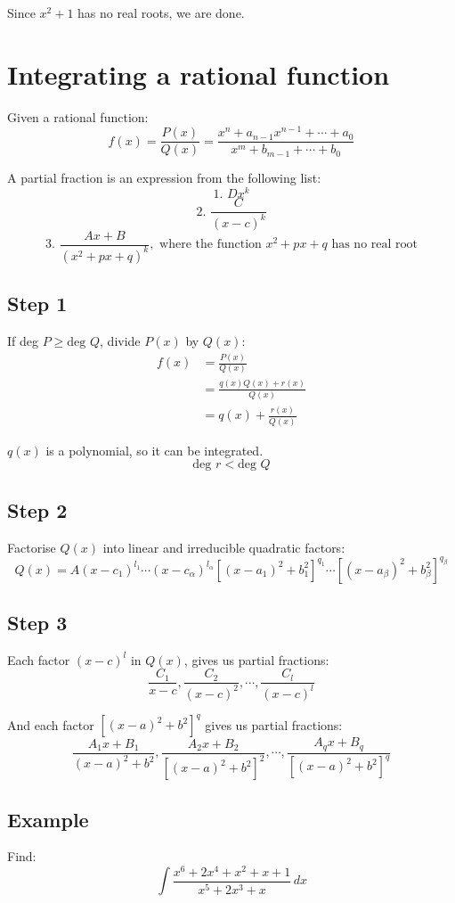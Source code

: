 \documentclass[11pt]{article}
\begin{document}
Since \(x^2 + 1\) has no real roots, we are done.
\section{Integrating a rational function}
\label{sec:orgab12845}
Given a rational function:
\[f(x) = \frac{P(x)}{Q(x)} = \frac{x^n + a_{n - 1} x^{n - 1} + \cdots + a_0}{x^m + b_{m - 1} + \cdots + b_0}\]

A partial fraction is an expression from the following list:
\[\text{1. } Dx^k\]
\[\text{2. } \frac{C}{(x - c)^k}\]
\[\text{3. } \frac{Ax + B}{(x^2 + px + q)^k}, \text{ where the function } x^2 + px + q \text{ has no real root}\]
\subsection{Step 1}
\label{sec:orga25056b}
If deg \(P \ge \text{deg } Q\), divide \(P(x)\) by \(Q(x)\):
\begin{align*}
f(x) &= \frac{P(x)}{Q(x)} \\
&= \frac{q(x)Q(x) + r(x)}{Q(x)} \\
&= q(x) + \frac{r(x)}{Q(x)}
\end{align*}

\(q(x)\) is a polynomial, so it can be integrated.
\[\text{deg } r < \text{deg } Q\]
\subsection{Step 2}
\label{sec:org5d923a8}
Factorise \(Q(x)\) into linear and irreducible quadratic factors:
\[Q(x) = A(x - c_1)^{l_1} \cdots (x - c_\alpha)^{l_\alpha}[(x - a_1)^2 + b_1^2]^{q_1} \cdots [(x - a_\beta)^2 + b_\beta^2]^{q_\beta}\]
\subsection{Step 3}
\label{sec:org31d9836}
Each factor \((x - c)^l\) in \(Q(x)\), gives us partial fractions:
\[\frac{C_1}{x - c}, \frac{C_2}{(x - c)^2}, \cdots, \frac{C_l}{(x - c)^l}\]

And each factor \([(x - a)^2 + b^2]^q\) gives us partial fractions:
\[\frac{A_1 x + B_1}{(x - a)^2 + b^2}, \frac{A_2 x + B_2}{[(x - a)^2 +b^2]^2}, \cdots, \frac{A_q x + B_q}{[(x - a)^2 + b^2]^q}\]
\subsection{Example}
\label{sec:org3283176}
Find:
\[\int \frac{x^6 + 2x^4 + x^2 + x + 1}{x^ 5 + 2x^3 + x} \, dx\]
\end{document}
